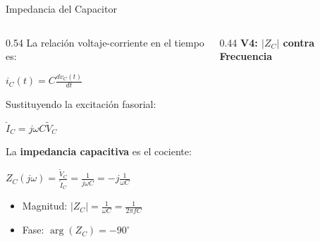 \documentclass[aspectratio=169, xcolor={table,xcdraw}]{beamer}
\begin{document}
\begin{frame}{Impedancia del Capacitor}
    \begin{columns}[T]
        \begin{column}{0.54\textwidth}
            La relación voltaje-corriente en el tiempo es: \par
            {\centering $\displaystyle i_C(t) = C \frac{dv_C(t)}{dt}$ \par}
            \vspace{0.2cm}
            Sustituyendo la excitación fasorial: \par
            {\centering $\displaystyle \tilde{I}_C = j\omega C \tilde{V}_C$ \par}
            \vspace{0.2cm}
            La \textbf{impedancia capacitiva} es el cociente: \par
            {\centering $\displaystyle Z_C(j\omega) = \frac{\tilde{V}_C}{\tilde{I}_C} = \frac{1}{j\omega C} = -j\frac{1}{\omega C}$ \par}
            \vspace{0.2cm}
            \begin{itemize}
                \item Magnitud: $\vert{}Z_C\vert{} = \frac{1}{\omega C} = \frac{1}{2\pi f C}$
                \item Fase: $\arg(Z_C) = -90^\circ$
            \end{itemize}
        \end{column}
        \begin{column}{0.44\textwidth}
            \centering
            \textbf{V4: $\vert{}Z_C\vert{}$ contra Frecuencia}
            \vspace{0.2cm}
            
        \end{column}
    \end{columns}
\end{frame}
\end{document}
